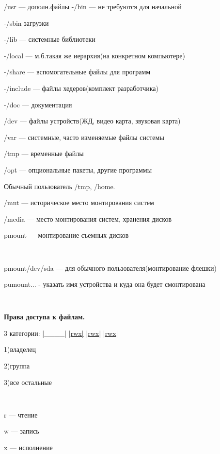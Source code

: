 \par /usr
— дополн.файлы	-/bin — не требуются для
начальной
\par 
				-/sbin    загрузки
\par 
				-/lib — системные библиотеки
\par 
				-/local — м.б.такая же иерархия(на
конкретном компьютере)
\par 
				-/share — вспомогательные файлы для
программ 

\par 
				-/include — файлы хедеров(комплект
разработчика)
\par 
				-/doc — документация 

\par 
/dev — файлы устройств(ЖД, видео карта,
звуковая карта)
\par 
/var — системные, часто изменяемые файлы
системы
\par 
/tmp — временные файлы
\par 
/opt — опциональные пакеты, другие
программы
\par 
Обычный пользователь /tmp, /home.
\par 
/mnt — историческое место монтирования
систем
\par 
/media — место монтирования систем, хранения
дисков
\par 
pmount — монтирование съемных дисков
\par 
\\

\par 
pmount/dev/sda — для обычного пользователя(монтирование
флешки)
\par 
pumount... - указать имя устройства и куда
она будет смонтирована
\par 
\\

\par \textbf{Права
доступа к файлам.}
\par 3
категории: |\_\_\_\_|
|\underline{rwx|}
|\underline{rwx}|
|\underline{rwx}|
\par 
1)владелец
\par 
2)группа
\par 
3)все остальные
\par 
\\

\par 
r — чтение
\par 
w — запись
\par 
x — исполнение 

